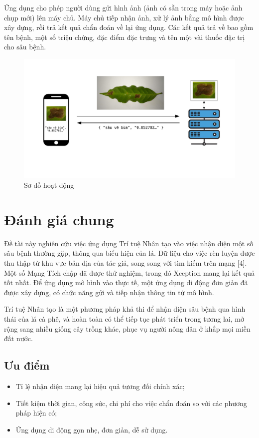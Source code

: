 \documentclass[a4paper,14pt]{extarticle}
\begin{document}
	Ứng dụng cho phép người dùng gửi hình ảnh (ảnh có sẵn trong máy hoặc ảnh chụp mới) lên máy chủ. Máy chủ tiếp nhận ảnh, xử lý ảnh bằng mô hình được xây dựng, rồi trả kết quả chẩn đoán về lại ứng dụng. Các kết quả trả về bao gồm tên bệnh, một số triệu chứng, đặc điểm đặc trưng và tên một vài thuốc đặc trị cho sâu bệnh.

	\begin{figure}[H]
		\centering
		\includegraphics[scale=0.4]{images/chart.pdf}
		\caption{Sơ đồ hoạt động}
	\end{figure}

		
\section{Đánh giá chung}
	Đề tài này nghiên cứu việc ứng dụng Trí tuệ Nhân tạo vào việc nhận diện một số sâu bệnh thường gặp, thông qua biểu hiện của lá. Dữ liệu cho việc rèn luyện được thu thập từ khu vực bản địa của tác giả, song song với tìm kiếm trên mạng [4]. Một số Mạng Tích chập đã được thử nghiệm, trong đó Xception mang lại kết quả tốt nhất. Để ứng dụng mô hình vào thực tế, một ứng dụng di động đơn giản đã được xây dựng, có chức năng gửi và tiếp nhận thông tin từ mô hình.
	
	Trí tuệ Nhân tạo là một phương pháp khả thi để nhận diện sâu bệnh qua hình thái của lá cà phê, và hoàn toàn có thể tiếp tục phát triển trong tương lai, mở rộng sang nhiều giống cây trồng khác, phục vụ người nông dân ở khắp mọi miền đất nước.

	\subsection{Ưu điểm}
	\begin{itemize}
		\item Tỉ lệ nhận diện mang lại hiệu quả tương đối chính xác;
		\item Tiết kiệm thời gian, công sức, chi phí cho việc chẩn đoán so với các phương pháp hiện có;
		\item Ứng dụng di động gọn nhẹ, đơn giản, dễ sử dụng.
	\end{itemize}
\end{document}
